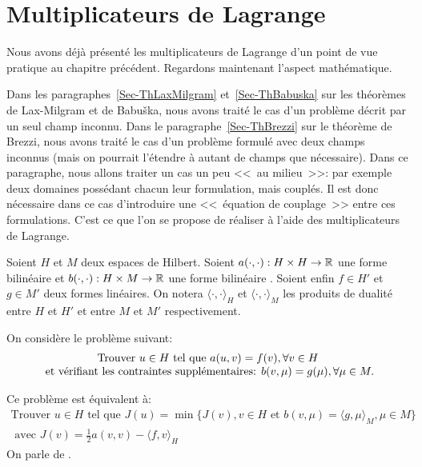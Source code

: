 \medskip



\section{Multiplicateurs de Lagrange}\label{Sec-MultLag}
Nous avons déjà présenté les multiplicateurs de Lagrange d'un point de
vue pratique au chapitre précédent.
Regardons maintenant l'aspect mathématique.

Dans les paragraphes~\ref{Sec-ThLaxMilgram} et~\ref{Sec-ThBabuska} sur les théorèmes de Lax-Milgram et
de Babuška, nous avons traité le cas d'un problème décrit par un seul champ inconnu.
Dans le paragraphe~\ref{Sec-ThBrezzi} sur le théorème de Brezzi, nous avons traité le cas d'un problème formulé
avec deux champs inconnus (mais on pourrait l'étendre à autant de champs
que nécessaire).
Dans ce paragraphe, nous allons traiter un cas un peu <<~au milieu~>>: par exemple
deux domaines possédant chacun leur formulation, mais couplés. Il est donc
nécessaire dans ce cas d'introduire une <<~équation de couplage~>> entre ces
formulations. C'est ce que l'on se propose de réaliser à l'aide des multiplicateurs
de Lagrange.

\medskip
\begin{definition}
Soient $H$ et $M$ deux espaces de Hilbert.
Soient  $a(\cdot,\cdot): H\times H\rightarrow\mathbb R$ une forme bilinéaire 
et  $b(\cdot,\cdot): H\times M\rightarrow\mathbb R$ une forme bilinéaire .
Soient enfin $f\in H'$ et $g\in M'$ deux formes linéaires. On notera
$\langle\cdot,\cdot\rangle_H$ et $\langle\cdot,\cdot\rangle_M$ les produits de dualité entre $H$ et $H'$
et entre $M$ et $M'$ respectivement.

\medskip
On considère le problème suivant:
\begin{equation}
\begin{array}{c}
\text{Trouver } u\in H \text{ tel que } a(u,v)=f(v), \forall v\in H \\
\text{ et vérifiant les
contraintes supplémentaires: } b(v,\mu)=g(\mu), \forall \mu\in M.
\end{array}
\end{equation}

\medskip
Ce problème est équivalent à:
\begin{equation}\label{Eq-Pmin}
\begin{array}{c}
\text{Trouver } u\in H \text{ tel que }
J(u)=\min\{J(v), v\in H \text{ et } b(v,\mu)=\langle g,\mu\rangle_M, \mu\in M\} \\[+3mm]
\text{ avec }
J(v)=\frac12 a(v,v)-\langle f,v\rangle_H
\end{array}
\end{equation}
On parle de .
\end{definition}

